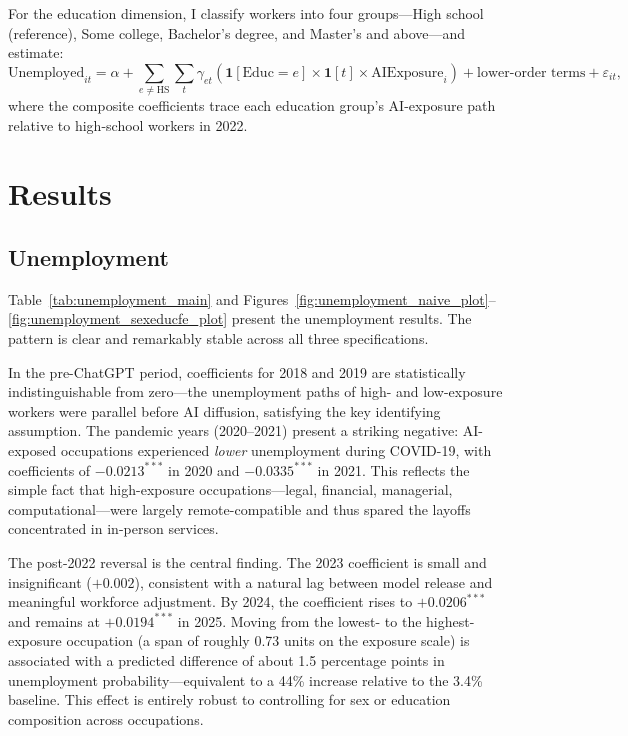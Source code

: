 \documentclass[11pt]{article}
\begin{document}
For the education dimension, I classify workers into four groups---High school (reference), Some college, Bachelor's degree, and Master's and above---and estimate:
\begin{equation}
\label{eq:educ}
\text{Unemployed}_{it} = \alpha
  + \sum_{e \neq \text{HS}} \sum_{t} \gamma_{et} \left( \mathbf{1}[\text{Educ}=e] \times \mathbf{1}[t] \times \text{AIExposure}_i \right)
  + \text{lower-order terms} + \varepsilon_{it},
\end{equation}
where the composite coefficients trace each education group's AI-exposure path relative to high-school workers in 2022.

\section{Results}
\label{sec:results}

\subsection{Unemployment}

Table~\ref{tab:unemployment_main} and Figures~\ref{fig:unemployment_naive_plot}--\ref{fig:unemployment_sexeducfe_plot} present the unemployment results. The pattern is clear and remarkably stable across all three specifications.

In the pre-ChatGPT period, coefficients for 2018 and 2019 are statistically indistinguishable from zero---the unemployment paths of high- and low-exposure workers were parallel before AI diffusion, satisfying the key identifying assumption. The pandemic years (2020--2021) present a striking negative: AI-exposed occupations experienced \emph{lower} unemployment during COVID-19, with coefficients of $-0.0213^{***}$ in 2020 and $-0.0335^{***}$ in 2021. This reflects the simple fact that high-exposure occupations---legal, financial, managerial, computational---were largely remote-compatible and thus spared the layoffs concentrated in in-person services.

The post-2022 reversal is the central finding. The 2023 coefficient is small and insignificant ($+0.002$), consistent with a natural lag between model release and meaningful workforce adjustment. By 2024, the coefficient rises to $+0.0206^{***}$ and remains at $+0.0194^{***}$ in 2025. Moving from the lowest- to the highest-exposure occupation (a span of roughly 0.73 units on the exposure scale) is associated with a predicted difference of about 1.5 percentage points in unemployment probability---equivalent to a 44\% increase relative to the 3.4\% baseline. This effect is entirely robust to controlling for sex or education composition across occupations.
\end{document}
